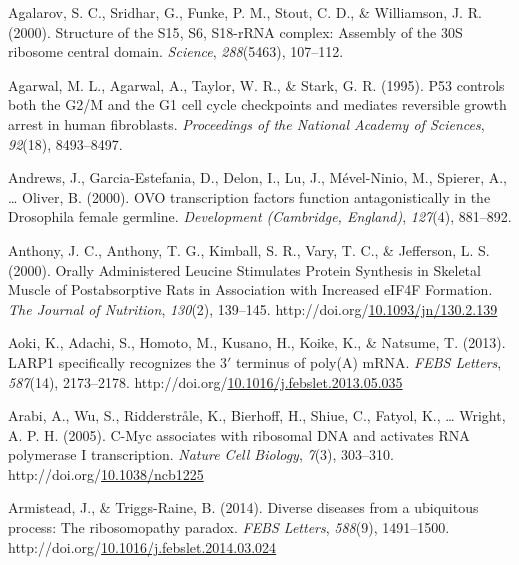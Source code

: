 \documentclass[12pt,oneside]{reedthesis}
\newlength{\cslhangindent}
\newenvironment{CSLReferences}[2] %
 {%
  \setlength{\parindent}{0pt}
  \ifodd #1 \everypar{\setlength{\hangindent}{\cslhangindent}}\ignorespaces\fi
  \ifnum #2 > 0
  \setlength{\parskip}{#2\baselineskip}
  \fi
 }%
 {}
\begin{document}
\hypertarget{refs}{}
\begin{CSLReferences}{1}{0}
\leavevmode{}%
Agalarov, S. C., Sridhar, G., Funke, P. M., Stout, C. D., \& Williamson, J. R. (2000). Structure of the {S15}, {S6}, {S18-rRNA} complex: Assembly of the {30S} ribosome central domain. \emph{Science}, \emph{288}(5463), 107--112.

\leavevmode{}%
Agarwal, M. L., Agarwal, A., Taylor, W. R., \& Stark, G. R. (1995). P53 controls both the {G2}/{M} and the {G1} cell cycle checkpoints and mediates reversible growth arrest in human fibroblasts. \emph{Proceedings of the National Academy of Sciences}, \emph{92}(18), 8493--8497.

\leavevmode{}%
Andrews, J., Garcia-Estefania, D., Delon, I., Lu, J., Mével-Ninio, M., Spierer, A., \ldots{} Oliver, B. (2000). {OVO} transcription factors function antagonistically in the {Drosophila} female germline. \emph{Development (Cambridge, England)}, \emph{127}(4), 881--892.

\leavevmode{}%
Anthony, J. C., Anthony, T. G., Kimball, S. R., Vary, T. C., \& Jefferson, L. S. (2000). Orally {Administered Leucine Stimulates Protein Synthesis} in {Skeletal Muscle} of {Postabsorptive Rats} in {Association} with {Increased eIF4F Formation}. \emph{The Journal of Nutrition}, \emph{130}(2), 139--145. http://doi.org/\href{https://doi.org/10.1093/jn/130.2.139}{10.1093/jn/130.2.139}

\leavevmode{}%
Aoki, K., Adachi, S., Homoto, M., Kusano, H., Koike, K., \& Natsume, T. (2013). {LARP1} specifically recognizes the 3{\({'}\)} terminus of poly({A}) {mRNA}. \emph{FEBS Letters}, \emph{587}(14), 2173--2178. http://doi.org/\href{https://doi.org/10.1016/j.febslet.2013.05.035}{10.1016/j.febslet.2013.05.035}

\leavevmode{}%
Arabi, A., Wu, S., Ridderstråle, K., Bierhoff, H., Shiue, C., Fatyol, K., \ldots{} Wright, A. P. H. (2005). C-{Myc} associates with ribosomal {DNA} and activates {RNA} polymerase {I} transcription. \emph{Nature Cell Biology}, \emph{7}(3), 303--310. http://doi.org/\href{https://doi.org/10.1038/ncb1225}{10.1038/ncb1225}

\leavevmode{}%
Armistead, J., \& Triggs-Raine, B. (2014). Diverse diseases from a ubiquitous process: {The} ribosomopathy paradox. \emph{FEBS Letters}, \emph{588}(9), 1491--1500. http://doi.org/\href{https://doi.org/10.1016/j.febslet.2014.03.024}{10.1016/j.febslet.2014.03.024}


\end{CSLReferences}
\end{document}
